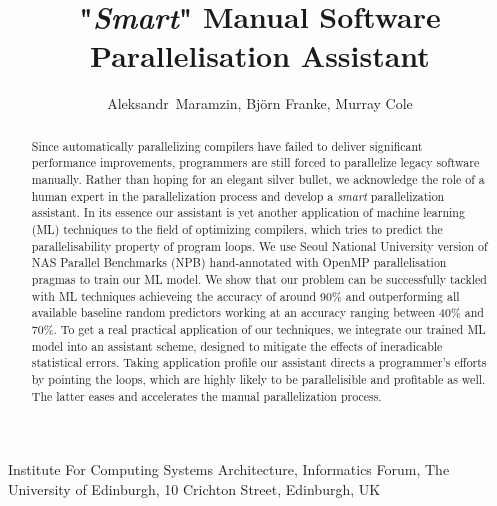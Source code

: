 \documentclass{acaces}
\begin{document}
\title{"\textit{Smart}" Manual Software Parallelisation Assistant}

\author{
Aleksandr~Maramzin,
Bj\"{o}rn Franke,
Murray Cole
}

\address{1}{
Institute For Computing Systems Architecture, 
Informatics Forum, 
The University of Edinburgh, 
10 Crichton Street, 
Edinburgh, 
UK
}


\pagestyle{empty}

\begin{abstract}
\null\quad Since automatically parallelizing compilers have failed to deliver significant performance improvements, programmers are still forced to parallelize legacy software manually. Rather than hoping for an elegant silver bullet, we acknowledge the role of a human expert in the parallelization process and develop a \textit{smart} parallelization assistant.\newline\null
\quad In its essence our assistant is yet another application of machine learning (ML) techniques to the field of optimizing compilers, which tries to predict the parallelisability property of program loops. We use Seoul National University version of NAS Parallel Benchmarks (NPB) hand-annotated with OpenMP parallelisation pragmas to train our ML model. We show that  our problem can be successfully tackled with ML techniques achieveing the accuracy of around 90\% and outperforming all available baseline random predictors working at an accuracy ranging between 40\% and 70\%.\newline\null
\quad To get a real practical application of our techniques, we integrate our trained ML model into an assistant scheme, designed to mitigate the effects of ineradicable statistical errors. Taking application profile our assistant directs a programmer's efforts by pointing the loops, which are highly likely to be parallelisible and profitable as well. The latter eases and accelerates the manual parallelization process. 
\end{abstract}

\end{document}
